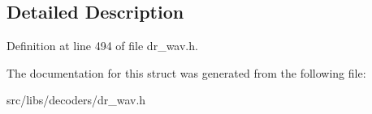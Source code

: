 \subsection{Detailed Description}


Definition at line 494 of file dr\-\_\-wav.\-h.



The documentation for this struct was generated from the following file\-:\begin{DoxyCompactItemize}
\item 
src/libs/decoders/dr\-\_\-wav.\-h\end{DoxyCompactItemize}
